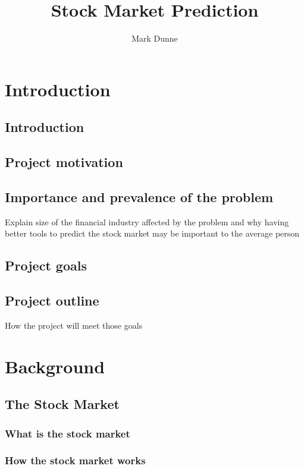 \documentclass[a4paper,11pt]{article}
\title{Stock Market Prediction}
\author{Mark Dunne}
\begin{document}
\maketitle
\tableofcontents

\begin{abstract}
\end{abstract}

\section{Introduction}
\subsection{Introduction}
\subsection{Project motivation}
\subsection{Importance and prevalence of the problem}
Explain size of the financial industry affected by the problem and why having better tools to predict the stock market may be important to the average person

\subsection{Project goals}

\subsection{Project outline}
How the project will meet those goals

\section{Background}
\subsection{The Stock Market}
\subsubsection{What is the stock market}
\subsubsection{How the stock market works}
\end{document}
